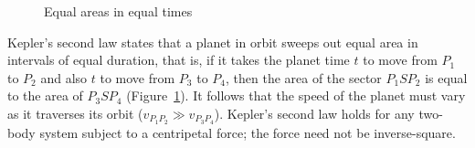 \begin{figure}[t]
\begin{minipage}{.5\textwidth}
\begin{center}
\caption{Equal areas in equal times}\label{f.grav-second}
\end{center}
\end{minipage}
\end{figure}


Kepler's second law states that a planet in orbit sweeps out equal area in intervals of equal duration, that is, if it takes the planet time $t$ to move from $P_1$ to $P_2$ and also $t$ to move from $P_3$ to $P_4$, then the area of the sector $P_1SP_2$ is equal to the area of $P_3SP_4$ (Figure~\ref{f.grav-second}). It follows that the speed of the planet must vary as it traverses its orbit ($v_{P_1P_2} \gg v_{P_3P_4}$). Kepler's second law holds for any two-body system subject to a centripetal force; the force need not be inverse-square.


